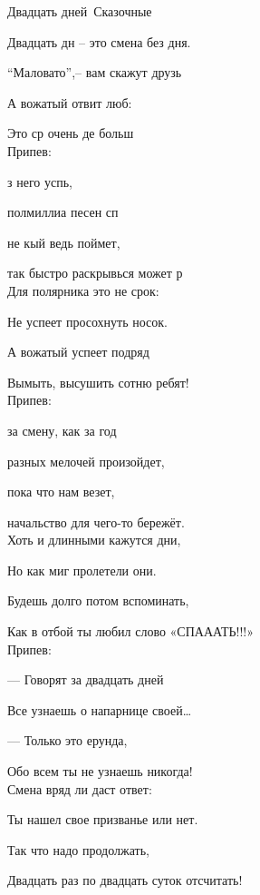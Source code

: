 \documentclass[11pt,a5paper]{book}
\renewcommand{\tt}{\indent \indent}
\begin{document}
\begin{song}{Двадцать дней}{}{~}{Сказочные}{}{}


Двадцать дн – это смена без дня.\par
“Маловато”,– вам скажут друзь\par
А вожатый отвит люб:\par
Это ср очень де больш\\
 

Припев:\par
{} з него успь,\par
{} полмиллиа песен сп\par
{} не кый ведь поймет,\par
{} так быстро раскрывься может р\\


Для полярника это не срок:\par
Не успеет просохнуть носок.\par
А вожатый успеет подряд \par
Вымыть, высушить сотню ребят!\\

Припев:\par
{} за смену, как за год \par
{} разных мелочей произойдет,\par
{} пока что нам везет,\par
{} начальство для чего-то бережёт.\\


\newpage
Хоть и длинными кажутся дни,\par
Но как миг пролетели они.\par
Будешь долго потом вспоминать,\par
Как в отбой ты любил слово «СПАААТЬ!!!»\\

Припев:\par
\tt          	— Говорят за двадцать дней \par
\tt          	Все узнаешь о напарнице своей…\par
\tt          	— Только это ерунда,\par
\tt          	Обо всем ты не узнаешь никогда!\\

Смена вряд ли даст ответ:\par
Ты нашел свое призванье или нет.\par
Так что надо продолжать,\par
Двадцать раз по двадцать суток отсчитать!\\


\end{song}
\end{document}
